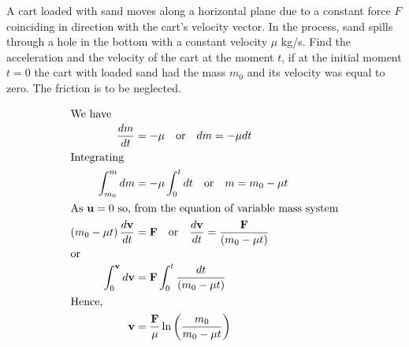\item A cart loaded with sand moves along a horizontal plane due to a constant force \( F \) coinciding in direction with the cart's velocity vector. In the process, sand spills through a hole in the bottom with a constant velocity \( \mu \) kg/s. Find the acceleration and the velocity of the cart at the moment \( t \), if at the initial moment \( t = 0 \) the cart with loaded sand had the mass \( m_0 \) and its velocity was equal to zero. The friction is to be neglected.\begin{solution}
    \begin{center}
    \end{center}
    
    \begin{align*}
        \intertext{We have}
        \dfrac{dm}{dt} &= -\mu \quad \text{or} \quad dm = -\mu dt\\
        \intertext{Integrating}
        \int_{m_0}^m dm &= -\mu \int_{0}^t dt \quad \text{or} \quad m = m_0 - \mu t\\
        \intertext{As $\mathbf{u} = 0$ so, from the equation of variable mass system}
        \left( m_0 - \mu t \right) \dfrac{d \mathbf{v}}{dt} &= \mathbf{F} \quad \text{or} \quad \dfrac{d \mathbf{v}}{dt} = \dfrac{\mathbf{F}}{\left( m_0 - \mu t \right)}\\
        \intertext{or}
        \int_{0}^{\mathbf{v}} d \mathbf{v} &= \mathbf{F} \int_{0}^{t} \dfrac{dt}{\left( m_0 - \mu t \right)}\\
        \intertext{Hence,}
        \mathbf{v} &= \dfrac{\mathbf{F}}{\mu} \ln \left( \dfrac{m_0}{m_0 - \mu t} \right)
    \end{align*}
\end{solution}